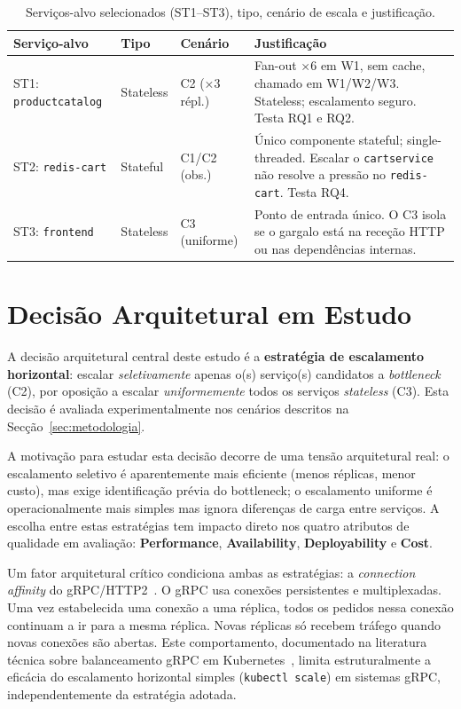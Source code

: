 \documentclass[manuscript,oneside]{acmart}
\begin{document}
\begin{table}[H]
\caption{Serviços-alvo selecionados (ST1--ST3), tipo, cenário de escala e justificação.}
\label{tab:alvos}
\begin{tabularx}{\columnwidth}{p{2cm}p{1.4cm}p{1.7cm}X}
\toprule
\textbf{Serviço-alvo} & \textbf{Tipo} & \textbf{Cenário} & \textbf{Justificação} \\
\midrule
ST1: \texttt{productcatalog} & Stateless & C2 (×3 répl.) & Fan-out ×6 em W1, sem cache, chamado em W1/W2/W3. Stateless; escalamento seguro. Testa RQ1 e RQ2. \\
\addlinespace
ST2: \texttt{redis-cart} & Stateful & C1/C2 (obs.) & Único componente stateful; single-threaded. Escalar o \texttt{cartservice} não resolve a pressão no \texttt{redis-cart}. Testa RQ4. \\
\addlinespace
ST3: \texttt{frontend} & Stateless & C3 (uniforme) & Ponto de entrada único. O C3 isola se o gargalo está na receção HTTP ou nas dependências internas. \\
\bottomrule
\end{tabularx}
\end{table}

\section{Decisão Arquitetural em Estudo}

A decisão arquitetural central deste estudo é a \textbf{estratégia de escalamento horizontal}: escalar \emph{seletivamente} apenas o(s) serviço(s) candidatos a \textit{bottleneck} (C2), por oposição a escalar \emph{uniformemente} todos os serviços \textit{stateless} (C3). Esta decisão é avaliada experimentalmente nos cenários descritos na Secção~\ref{sec:metodologia}.

A motivação para estudar esta decisão decorre de uma tensão arquitetural real: o escalamento seletivo é aparentemente mais eficiente (menos réplicas, menor custo), mas exige identificação prévia do bottleneck; o escalamento uniforme é operacionalmente mais simples mas ignora diferenças de carga entre serviços. A escolha entre estas estratégias tem impacto direto nos quatro atributos de qualidade em avaliação: \textbf{Performance}, \textbf{Availability}, \textbf{Deployability} e \textbf{Cost}.

Um fator arquitetural crítico condiciona ambas as estratégias: a \textit{connection affinity} do gRPC/HTTP2~\cite{grpcloadbalancing,k8sgrpc}. O gRPC usa conexões persistentes e multiplexadas. Uma vez estabelecida uma conexão a uma réplica, todos os pedidos nessa conexão continuam a ir para a mesma réplica. Novas réplicas só recebem tráfego quando novas conexões são abertas. Este comportamento, documentado na literatura técnica sobre balanceamento gRPC em Kubernetes~\cite{k8sgrpc}, limita estruturalmente a eficácia do escalamento horizontal simples (\texttt{kubectl scale}) em sistemas gRPC, independentemente da estratégia adotada.
\end{document}
